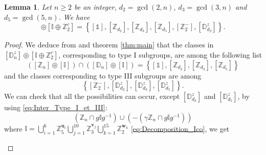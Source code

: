 \documentclass[11pt,a4paper]{amsart}
\newtheorem{lem}[thm]{Lemma}
\theoremstyle{definition}
\newcommand{\ZZ}{\mathbb{Z}}                %
\newcommand{\ico}{\mathbb{I}}               %
\newcommand{\DD}{\mathbb{D}}                %
\newcommand{\1}{\mathds{1}}		            %
\newcommand{\uu}{\pmb{u}}                   %
\newcommand{\vv}{\pmb{v}}                   %
\newcommand{\set}[1]{\left\{#1\right\}}     %
\newcommand{\Dnz}{\DD_n^z}
\begin{document}
	


\begin{lem}\label{lem:Dnz-with_ico}
Let $n\geq 2$ be an integer, $d_2=\gcd(2,n)$, $d_3=\gcd(3,n)$ and $d_5=\gcd(5,n)$. We have
		\begin{equation*}
	[\Dnz] \circledcirc [\ico \oplus \ZZ_2^c]   =\set{[\1],[\ZZ_{d_2}],[\ZZ_{d_3}],[\ZZ_{d_5}],[\ZZ_{2}^{-}],[\DD_{d_2}^z]}.
		\end{equation*}
		
	\end{lem}
	
	
	\begin{proof}
		We deduce from \cite[table 1]{Olive2019} and theorem \ref{thm:main} that the classes in $[\DD_n^z]\circledcirc [\ico\oplus \ZZ_2^c]$, corresponding to type I subgroups, are among the following list
		\begin{equation*}
		([\ZZ_n]\circledcirc [\ico])\cap ([\DD_n]\circledcirc[\ico])=\set{[\1],[\ZZ_{d_2}],[\ZZ_{d_3}],[\ZZ_{d_5}]}
		\end{equation*}
		and the classes corresponding to type III subgroups are among
		\begin{equation*}
		\set{[\ZZ_2^-],[\DD_{d_2}^z] ,[\DD_{d_3}^z],[\DD_{d_5}^z]}.
		\end{equation*}
		We can check that all the possibilities can occur, except $[\DD_{d_3}^z]$ and $[\DD_{d_5}^z]$, by using \eqref{eq:Inter_Type_I_et_III}:
		\begin{equation*}
		(\ZZ_n\cap g \ico g^{-1})\cup (-(\gamma\ZZ_n\cap g \ico g^{-1}))
		\end{equation*}
		where $ \ico=\bigcup_{i=1}^6 \ZZ_5^{\uu_i}\bigcup_{j=1}^{10} \ZZ_3^{\vv_j}\bigcup_{k=1}^{15}\ZZ_2^{\pmb{w}_k}$ \eqref{eq:Decomposition_Ico},
		we get
		\begin{itemize}
			

\end{itemize}
\end{proof}
\end{document}
